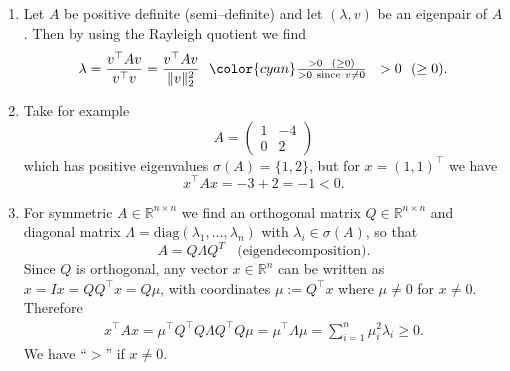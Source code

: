 {
\color{solution}
\begin{enumerate}
	\item %
	Let $A$ be positive definite (semi--definite) and let $(\lambda, v)$ be an eigenpair of $A$. Then by using the Rayleigh quotient we find
	$$\lambda = \frac{v^\top A v}{v^\top v} = \frac{v^\top A v}{\|v\|_2^2}~~{\color{cyan}\tfrac{> 0~~ (\geq 0)}{> 0 ~ \text{since}~v\neq 0  }} ~~> 0~~ (\geq 0). $$
%	
	\item Take for example 
	$$A=\begin{pmatrix}
	1&-4\\
	0&2
	\end{pmatrix} $$
	which has positive eigenvalues $\sigma(A)=\{1,2\}$, but for $x=(1,1)^\top$ we have
		$$x^\top A x = -3+2 = -1 < 0. $$
	\item 	For symmetric $A\in\mathbb{R}^{n\times n}$ we find an orthogonal matrix $Q\in\mathbb{R}^{n\times n}$ and diagonal matrix $\Lambda = \text{diag}(\lambda_1,\ldots,\lambda_n)$ with $\lambda_i\in\sigma(A)$, so that   $$A=Q\Lambda Q^T ~~~~\text{(eigendecomposition)}.$$
	Since $Q$ is orthogonal, any vector $x \in \mathbb{R}^n$ can be written as $x = Ix=QQ^\top x=Q\mu$, with coordinates $\mu := Q^\top x$ where $\mu \neq 0$ for $x\neq 0$. Therefore 
	\begin{equation*}
	\begin{aligned}
	x^\top A x = \mu^\top Q^\top Q\Lambda Q^\top Q \mu = \mu^\top \Lambda \mu = \sum_{i=1}^n \mu_i^2 \lambda_i \geq 0.
	\end{aligned}
	\end{equation*}
	We have ``$>$'' if $x \neq 0$.

\end{enumerate}}
